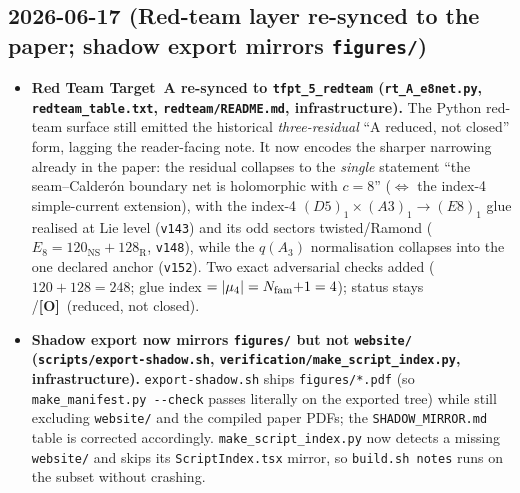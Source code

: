 \documentclass[11pt]{article}
\providecommand{\mO}{\textbf{[O]}}\providecommand{\mX}{\textbf{[X]}}
\providecommand{\vref}[1]{\texttt{#1}}
\begin{document}
\subsection*{2026-06-17 (Red-team layer re-synced to the paper; shadow export mirrors \texttt{figures/})}
\begin{itemize}
\item \textbf{Red Team Target~A re-synced to \texttt{tfpt\_5\_redteam} (\texttt{rt\_A\_e8net.py},
  \texttt{redteam\_table.txt}, \texttt{redteam/README.md}, infrastructure).} The Python red-team
  surface still emitted the historical \emph{three-residual} ``A reduced, not closed'' form, lagging the
  reader-facing note. It now encodes the sharper narrowing already in the paper: the residual collapses to
  the \emph{single} statement ``the seam--Calder\'on boundary net is holomorphic with $c=8$'' ($\Leftrightarrow$
  the index-4 simple-current extension), with the index-4 $(D5)_1\times(A3)_1\to(E8)_1$ glue realised at Lie
  level (\vref{v143}) and its odd sectors twisted/Ramond ($E_8=120_{\mathrm{NS}}+128_{\mathrm{R}}$, \vref{v148}),
  while the $q(A_3)$ normalisation collapses into the one declared anchor (\vref{v152}). Two exact adversarial
  checks added ($120{+}128=248$; glue index $=|\mu_4|=N_{\mathrm{fam}}{+}1=4$); status stays \mC/\mO\ (reduced, not closed).
\item \textbf{Shadow export now mirrors \texttt{figures/} but not \texttt{website/}
  (\texttt{scripts/export-shadow.sh}, \texttt{verification/make\_script\_index.py}, infrastructure).}
  \texttt{export-shadow.sh} ships \texttt{figures/*.pdf} (so \texttt{make\_manifest.py -{}-check} passes
  literally on the exported tree) while still excluding \texttt{website/} and the compiled paper PDFs; the
  \texttt{SHADOW\_MIRROR.md} table is corrected accordingly. \texttt{make\_script\_index.py} now detects a
  missing \texttt{website/} and skips its \texttt{ScriptIndex.tsx} mirror, so \texttt{build.sh notes} runs on
  the subset without crashing.
\end{itemize}
\end{document}
